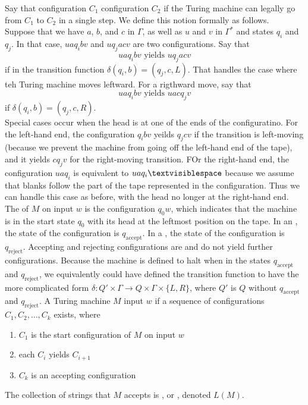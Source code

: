 \documentclass{article}
\begin{document}
Say that configuration $C_1$  configuration $C_2$ if the Turing machine can legally go from $C_1$ to $C_2$ in a single step. We define this notion formally as follows. \\ 
Suppose that we have $a$, $b$, and $c$ in $\Gamma$, as well as $u$ and $v$ in $\Gamma^{*}$ and states $q_i$ and $q_j$. In that case, $uaq_i bv$ and $uq_j acv$ are two configurations. Say that $$uaq_i bv \textrm{  yields  } uq_j acv$$ if in the transition function $\delta(q_i,b) = (q_j , c , L)$. That handles the case where teh Turing machine moves leftward. For a rigthward move, say that $$uaq_i bv \textrm{  yields  } uacq_j v$$ if $\delta(q_i,b) = (q_j , c, R)$. \\ 

Special cases occur when the head is at one of the ends of the configuratino. For the left-hand end, the configuration $q_i bv$ yeilds $q_j cv$ if the transition is left-moving (because we prevent the machine from going off the left-hand end of the tape), and it yields $c q_j v$ for the right-moving transition. FOr the right-hand end, the configuration $uaq_i$ is equivalent to $uaq_i \textvisiblespace$ because we assume that blanks follow the part of the tape represented in the configuration. Thus we can handle this case as before, with the head no longer at the right-hand end. \\ 

The  of $M$ on input $w$ is the configuration $q_0 w$, which indicates that the machine is in the start state $q_0$ with its head at the leftmost position on the tape. In an , the state of the configuration is $q_{\textrm{accept}}$. In a , the state of the configuration is $q_{\textrm{reject}}$. Accepting and rejecting configurations are  and do not yield further configurations. Because the machine is defined to halt when in the states $q_{\textrm{accept}}$ and $q_{\textrm{reject}}$, we equivalently could have defined the transition function to have the more complicated form $\delta: Q' \times \Gamma \rightarrow Q \times \Gamma \times \{L,R\}$, where $Q'$ is $Q$ without $q_{\textrm{accept}}$ and $q_{\textrm{reject}}$. A Turing machine $M$  input $w$ if a sequence of configurations $C_1 , C_2 , \dots , C_k$ exists, where 
\begin{enumerate}
  \item $C_1$ is the start configuration of $M$ on input $w$ 
  \item each $C_i$ yields $C_{i+1}$ 
  \item $C_k$ is an accepting configuration
\end{enumerate}
The collection of strings that $M$ accepts is , or , denoted $L(M)$. 
\end{document}
